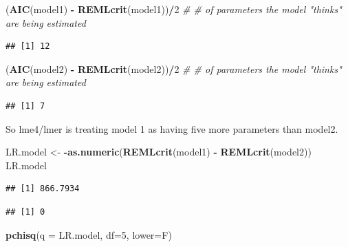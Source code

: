 \documentclass[
]{article}
\newenvironment{Shaded}{\begin{snugshade}}{\end{snugshade}}
\newcommand{\CommentTok}[1]{\textcolor[rgb]{0.56,0.35,0.01}{\textit{#1}}}
\newcommand{\DataTypeTok}[1]{\textcolor[rgb]{0.13,0.29,0.53}{#1}}
\newcommand{\DecValTok}[1]{\textcolor[rgb]{0.00,0.00,0.81}{#1}}
\newcommand{\KeywordTok}[1]{\textcolor[rgb]{0.13,0.29,0.53}{\textbf{#1}}}
\newcommand{\NormalTok}[1]{#1}
\newcommand{\OperatorTok}[1]{\textcolor[rgb]{0.81,0.36,0.00}{\textbf{#1}}}
\newcommand{\StringTok}[1]{\textcolor[rgb]{0.31,0.60,0.02}{#1}}
\begin{document}
\begin{Shaded}
\begin{Highlighting}[]
\NormalTok{(}\KeywordTok{AIC}\NormalTok{(model1) }\OperatorTok{-}\StringTok{ }\KeywordTok{REMLcrit}\NormalTok{(model1))}\OperatorTok{/}\DecValTok{2} \CommentTok{# # of parameters the model "thinks" are being estimated}
\end{Highlighting}
\end{Shaded}

\begin{verbatim}
## [1] 12
\end{verbatim}

\begin{Shaded}
\begin{Highlighting}[]
\NormalTok{(}\KeywordTok{AIC}\NormalTok{(model2) }\OperatorTok{-}\StringTok{ }\KeywordTok{REMLcrit}\NormalTok{(model2))}\OperatorTok{/}\DecValTok{2} \CommentTok{# # of parameters the model "thinks" are being estimated}
\end{Highlighting}
\end{Shaded}

\begin{verbatim}
## [1] 7
\end{verbatim}

So lme4/lmer is treating model 1 as having five more parameters than
model2.

\begin{Shaded}
\begin{Highlighting}[]
\NormalTok{LR.model <-}\StringTok{  }\OperatorTok{-}\KeywordTok{as.numeric}\NormalTok{(}\KeywordTok{REMLcrit}\NormalTok{(model1) }\OperatorTok{-}\StringTok{ }\KeywordTok{REMLcrit}\NormalTok{(model2))}
\NormalTok{LR.model}
\end{Highlighting}
\end{Shaded}

\begin{verbatim}
## [1] 866.7934
\end{verbatim}

\begin{Shaded}
\end{Shaded}

\begin{verbatim}
## [1] 0
\end{verbatim}

\begin{Shaded}
\begin{Highlighting}[]
\KeywordTok{pchisq}\NormalTok{(}\DataTypeTok{q =}\NormalTok{ LR.model, }\DataTypeTok{df=}\DecValTok{5}\NormalTok{, }\DataTypeTok{lower=}\NormalTok{F)}
\end{Highlighting}
\end{Shaded}
\end{document}
